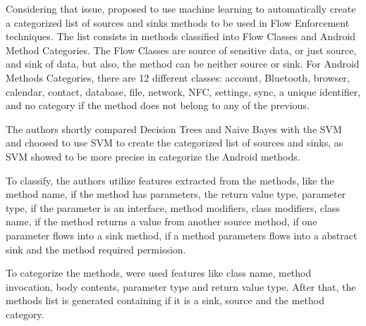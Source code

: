 Considering that issue, \cite{rasthofer2014machine} proposed to use machine learning to automatically create a categorized list of sources and sinks methods to be used in Flow Enforcement techniques. The list consists in methods classified into Flow Classes and Android Method Categories. The Flow Classes are source of sensitive data, or just source, and sink of data, but also, the method can be neither source or sink. For Android Methods Categories, there are 12 different classes: account, Bluetooth, browser, calendar, contact, database, file, network, NFC, settings, sync, a unique identifier, and no category if the method does not belong to any of the previous.

The authors shortly compared Decision Trees and Naive Bayes with the SVM and choosed to use SVM to create the categorized list of sources and sinks, as SVM showed to be more precise in categorize the Android methods. 

To classify, the authors utilize features extracted from the methods, like the method name, if the method has parameters, the return value type, parameter type, if the parameter is an interface, method modifiers, class modifiers, class name, if the method returns a value from another source method, if one parameter flows into a sink method, if a method parameters flows into a abstract sink and the method required permission. 

To categorize the methods, were used features like class name, method invocation, body contents, parameter type and return value type. After that, the methods list is generated containing if it is a sink, source and the method category.

